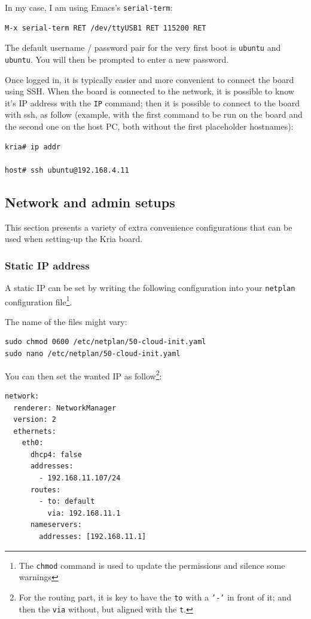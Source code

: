 \documentclass[10pt]{article}
\begin{document}
In my case, I am using Emacs's \texttt{serial-term}:
\begin{verbatim}
M-x serial-term RET /dev/ttyUSB1 RET 115200 RET
\end{verbatim}

The default username / password pair for the very first boot is \texttt{ubuntu} and \texttt{ubuntu}. You will then be prompted to enter a new password.

Once logged in, it is typically easier and more convenient to connect the board
using SSH. When the board is connected to the network, it is possible to know
it's IP address with the \texttt{IP} command; then it is possible to connect to
the board with ssh, as follow (example, with the first command to be run on the board
and the second one on the host PC, both without the first placeholder hostnames):
\begin{verbatim}
kria# ip addr

host# ssh ubuntu@192.168.4.11
\end{verbatim}

\subsection{Network and admin setups}
\label{sec:org1516f0d}
This section presents a variety of extra convenience configurations
that can be used when setting-up the Kria board.

\subsubsection{Static IP address}
\label{sec:orgd70cd01}
A static IP can be set by writing the following
configuration into your \texttt{netplan} configuration file\footnote{The \texttt{chmod} command is used to update the permissions and silence some warnings}.

The name of the files might vary:
\begin{verbatim}
sudo chmod 0600 /etc/netplan/50-cloud-init.yaml 
sudo nano /etc/netplan/50-cloud-init.yaml
\end{verbatim}

You can then set the wanted IP as follow\footnote{For the routing part, it is key to have the \texttt{to} with a \texttt{'-'} in front of
it; and then the \texttt{via} without, but aligned with the \texttt{t}.}:
\begin{verbatim}
network:
  renderer: NetworkManager
  version: 2
  ethernets:
    eth0:
      dhcp4: false
      addresses:
        - 192.168.11.107/24
      routes:
        - to: default
          via: 192.168.11.1
      nameservers:
        addresses: [192.168.11.1]
\end{verbatim}
\end{document}
